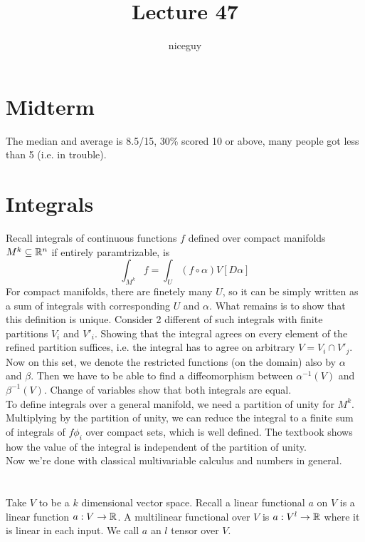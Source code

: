 \documentclass[12pt]{article}
\title{Lecture 47}
\author{niceguy}
\begin{document}
\maketitle

\section{Midterm}

The median and average is 8.5/15, 30\% scored 10 or above, many people got less than 5 (i.e. in trouble).

\section{Integrals}
Recall integrals of continuous functions $f$ defined over compact manifolds $M^k \subseteq \mathbb{R}^n$ if entirely paramtrizable, is
$$\int_{M^k} f = \int_U (f\circ\alpha) V[D\alpha]$$
For compact manifolds, there are finetely many $U$, so it can be simply written as a sum of integrals with corresponding $U$ and $\alpha$. What remains is to show that this definition is unique. Consider 2 different of such integrals with finite partitions $V_i$ and $V'_i$. Showing that the integral agrees on every element of the refined partition suffices, i.e. the integral has to agree on arbitrary $V = V_i \cap V'_j$. Now on this set, we denote the restricted functions (on the domain) also by $\alpha$ and $\beta$. Then we have to be able to find a diffeomorphism between $\alpha^{-1}(V)$ and $\beta^{-1}(V)$. Change of variables show that both integrals are equal. \\

To define integrals over a general manifold, we need a partition of unity for $M^k$. Multiplying by the partition of unity, we can reduce the integral to a finite sum of integrals of $f\phi_i$ over compact sets, which is well defined. The textbook shows how the value of the integral is independent of the partition of unity. \\

Now we're done with classical multivariable calculus and numbers in general.

\section{}

Take $V$ to be a $k$ dimensional vector space. Recall a linear functional $a$ on $V$ is a linear function $a:V \rightarrow \mathbb{R}$. A multilinear functional over $V$ is $a: V^l \rightarrow \mathbb{R}$ where it is linear in each input. We call $a$ an $l$ tensor over $V$.
\end{document}
